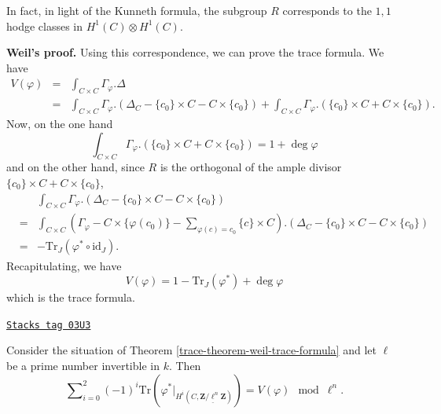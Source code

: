 In fact, in light of the Kunneth formula, the subgroup $R$ corresponds to the
$1, 1$ hodge classes in $H^1(C)\otimes H^1(C)$.

\medskip\noindent
{\bf Weil's proof.} Using this correspondence, we can prove the trace
formula. We have
\begin{eqnarray*}
V(\varphi) & = & \int_{C \times C} \Gamma_\varphi.\Delta \\
& = & \int_{C \times C} \Gamma_\varphi. \left(\Delta_C - \{c_0\} \times C - C
\times \{c_0\}\right) + \int_{C \times C} \Gamma_\varphi. \left(\{c_0\} \times C
+ C \times \{c_0\}\right).
\end{eqnarray*}
Now, on the one hand
$$
\int_{C \times C} \Gamma_\varphi. \left(\{c_0\} \times C + C \times
\{c_0\}\right)
=
1 + \deg \varphi
$$
and on the other hand, since $R$ is the orthogonal of the ample divisor
$\{c_0\} \times C + C \times \{c_0\}$,
\begin{eqnarray*}
& &
\int_{C \times C} \Gamma_\varphi. \left(\Delta_C - \{c_0\} \times C - C \times
\{c_0\}\right) \\
& = &
\int_{C \times C} \left(\Gamma_\varphi - C \times \{\varphi(c_0)\} -
\sum_{\varphi(c) = c_0} \{c\} \times C \right). \left(\Delta_C - \{c_0\} \times
C - C \times \{c_0\}\right) \\
& = & - \text{Tr}_J (\varphi^* \circ \text{id}_J).
\end{eqnarray*}
Recapitulating, we have
$$
V(\varphi) = 1 - \text{Tr}_J (\varphi^*) + \deg \varphi
$$
which is the trace formula.

\begin{lemma}
\label{trace-lemma-weil-mod}
\href{https://stacks.math.columbia.edu/tag/03U3}{\texttt{Stacks tag 03U3}}

Consider the situation of
Theorem \ref{trace-theorem-weil-trace-formula}
and let $\ell$ be a prime number invertible in $k$. Then
$$
\sum\nolimits_{i = 0}^2
(-1)^i
\text{Tr}(\varphi^* |_{H^i (C, \underline{\mathbf{Z}/\ell^n \mathbf{Z}})})
=
V(\varphi) \mod \ell^n.
$$
\end{lemma}

